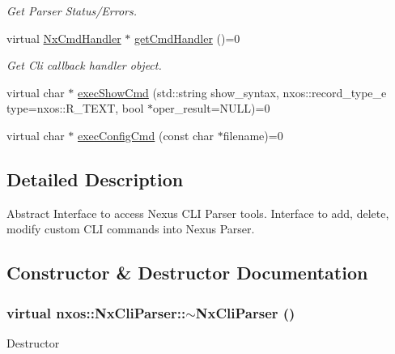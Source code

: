 \begin{DoxyCompactItemize}
\begin{DoxyCompactList}\small\item\em Get Parser Status/Errors. \item\end{DoxyCompactList}\item 
\hypertarget{classnxos_1_1NxCliParser_af058955d7c6dae444a5dab084342d03c}{
virtual \hyperlink{classnxos_1_1NxCmdHandler}{NxCmdHandler} $\ast$ \hyperlink{classnxos_1_1NxCliParser_af058955d7c6dae444a5dab084342d03c}{getCmdHandler} ()=0}
\label{classnxos_1_1NxCliParser_af058955d7c6dae444a5dab084342d03c}

\begin{DoxyCompactList}\small\item\em Get Cli callback handler object. \item\end{DoxyCompactList}\item 
virtual char $\ast$ \hyperlink{classnxos_1_1NxCliParser_a44b08502fa02c0f83b9dc26ef02e2be8}{execShowCmd} (std::string show\_\-syntax, nxos::record\_\-type\_\-e type=nxos::R\_\-TEXT, bool $\ast$oper\_\-result=NULL)=0
\item 
virtual char $\ast$ \hyperlink{classnxos_1_1NxCliParser_aa22ee0395ceadc46a3e28b93c5a5b75e}{execConfigCmd} (const char $\ast$filename)=0
\end{DoxyCompactItemize}


\subsection{Detailed Description}
Abstract Interface to access Nexus CLI Parser tools. Interface to add, delete, modify custom CLI commands into Nexus Parser. 

\subsection{Constructor \& Destructor Documentation}
\hypertarget{classnxos_1_1NxCliParser_ae7d5ada6ff25efd19ba95161fa60eeac}{
\subsubsection[{$\sim$NxCliParser}]{\setlength{\rightskip}{0pt plus 5cm}virtual nxos::NxCliParser::$\sim$NxCliParser ()}}
\label{classnxos_1_1NxCliParser_ae7d5ada6ff25efd19ba95161fa60eeac}
Destructor 

